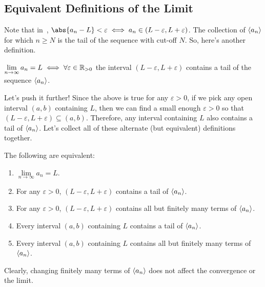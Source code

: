 \subsection*{Equivalent Definitions of the Limit}
Note that in~, $ \abs{a_n-L}<\varepsilon \iff a_n\in(L-\varepsilon,L+\varepsilon) $.
The collection of $ \langle a_n\rangle $ for which
$ n\ge N $ is the tail of the sequence with cut-off $ N $. So, here's another definition.
\begin{Definition}{}{}
    $ \lim\limits_{{n} \to {\infty}}a_n=L \iff \forall \varepsilon\in\mathbb{R}_{>0} $ the interval
    $ (L-\varepsilon,L+\varepsilon) $ contains a tail of the sequence $ \langle a_n\rangle $.
\end{Definition}
Let's push it further! Since the above is true for any $ \varepsilon>0 $, if we pick any
open interval $ (a,b) $ containing $ L $, then we can find a small enough $ \varepsilon>0 $
so that $ (L-\varepsilon,L+\varepsilon)\subseteq (a,b) $. Therefore, any interval containing
$ L $ also contains a tail of $ \langle a_n\rangle $. Let's collect all of these alternate (but equivalent) definitions together.
\begin{Theorem}{}{}
    The following are equivalent:
    \begin{enumerate}[(1)]
        \item $ \lim\limits_{{n} \to {\infty}}a_n=L $.
        \item For any $ \varepsilon>0 $, $ (L-\varepsilon,L+\varepsilon) $ contains a tail of $ \langle a_n\rangle $.
        \item For any $ \varepsilon>0 $, $ (L-\varepsilon,L+\varepsilon) $ contains all but finitely many terms of $ \langle a_n\rangle $.
        \item Every interval $ (a,b) $ containing $ L $ contains a tail of $ \langle a_n\rangle $.
        \item Every interval $ (a,b) $ containing $ L $ contains all but finitely many terms of $ \langle a_n\rangle $.
    \end{enumerate}
    Clearly, changing finitely many terms of $ \langle a_n\rangle $ does not affect the convergence or the limit.
\end{Theorem}
